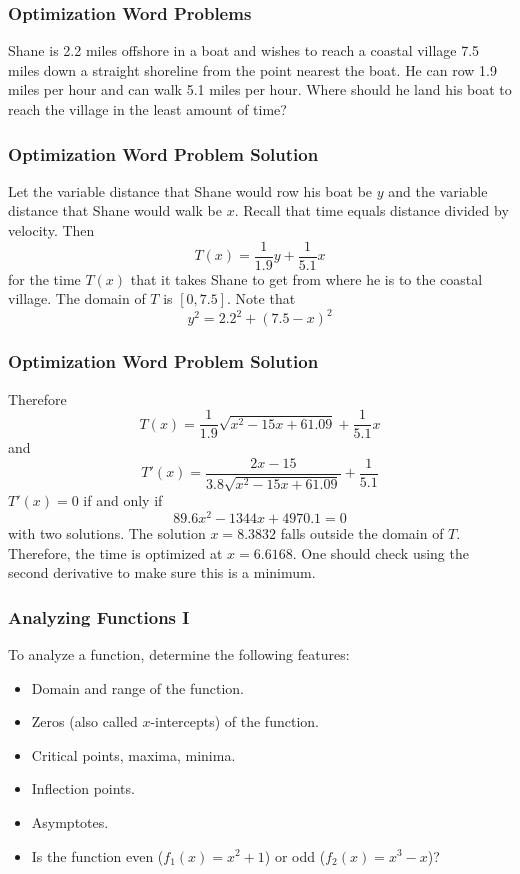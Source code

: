 \documentclass[xcolor=dvipsnames]{beamer}
\newcommand{\reeq}{2.2}
\newcommand{\aeza}{7.5}
\newcommand{\emah}{1.9}
\newcommand{\biet}{5.1}
\newcommand{\hohq}{Shane}
\newcommand{\wili}{He}
\newcommand{\ahhi}{he}
\newcommand{\bohh}{his}
\begin{document}
\begin{frame}
  \frametitle{Optimization Word Problems}
  {\ubung} {\hohq} is {\reeq} miles offshore in a boat and wishes to
  reach a coastal village {\aeza} miles down a straight shoreline from
  the point nearest the boat. {\wili} can row {\emah} miles per hour
  and can walk {\biet} miles per hour. Where should {\ahhi} land
  {\bohh} boat to reach the village in the least amount of time?
\end{frame}

\begin{frame}
  \frametitle{Optimization Word Problem Solution}
Let the variable distance that Shane would row his boat be $y$ and the
variable distance that Shane would walk be $x$. Recall that time
equals distance divided by velocity. Then
\begin{equation}
  \label{eq:chahghei}
  T(x)=\frac{1}{1.9}y+\frac{1}{5.1}x
\end{equation}
for the time $T(x)$ that it takes Shane to get from where he is to the
coastal village. The domain of $T$ is $[0,7.5]$. Note that
\begin{equation}
  \label{eq:oofoopoh}
  y^{2}=2.2^{2}+(7.5-x)^{2}
\end{equation}
\end{frame}

\begin{frame}
  \frametitle{Optimization Word Problem Solution}
Therefore
\begin{equation}
  \label{eq:iegaexov}
  T(x)=\frac{1}{1.9}\sqrt{x^{2}-15x+61.09}+\frac{1}{5.1}x
\end{equation}
and
\begin{equation}
  \label{eq:ahwohmoo}
  T'(x)=\frac{2x-15}{3.8\sqrt{x^{2}-15x+61.09}}+\frac{1}{5.1}
\end{equation}
$T'(x)=0$ if and only if
\begin{equation}
  \label{eq:phieghen}
  89.6x^{2}-1344x+4970.1=0
\end{equation}
with two solutions. The solution $x=8.3832$ falls outside the domain
of $T$. Therefore, the time is optimized at $x=6.6168$. One should
check using the second derivative to make sure this is a minimum.
\end{frame}

\begin{frame}
  \frametitle{Analyzing Functions I}
To analyze a function, determine the following features:
\begin{itemize}
\item Domain and range of the function.
\item Zeros (also called $x$-intercepts) of the function.
\item Critical points, maxima, minima.
\item Inflection points.
\item Asymptotes.
\item Is the function even ($f_{1}(x)=x^{2}+1$) or odd ($f_{2}(x)=x^{3}-x$)?
\end{itemize}
\end{frame}
\end{document}
